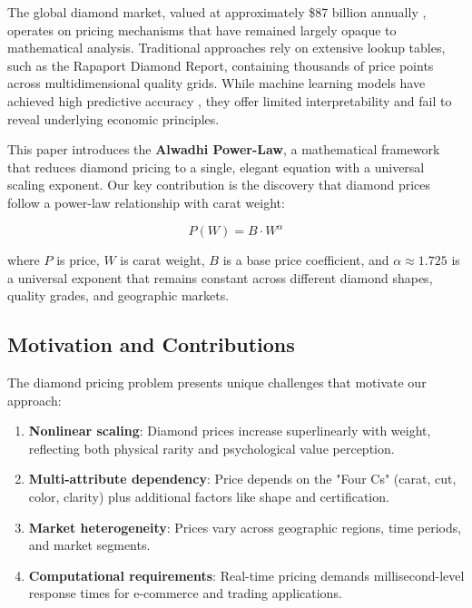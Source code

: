 \documentclass[12pt,a4paper]{article}
\begin{document}
The global diamond market, valued at approximately \$87 billion annually \citep{bain2023}, operates on pricing mechanisms that have remained largely opaque to mathematical analysis. Traditional approaches rely on extensive lookup tables, such as the Rapaport Diamond Report, containing thousands of price points across multidimensional quality grids. While machine learning models have achieved high predictive accuracy \citep{zhang2022}, they offer limited interpretability and fail to reveal underlying economic principles.

This paper introduces the \textbf{Alwadhi Power-Law}, a mathematical framework that reduces diamond pricing to a single, elegant equation with a universal scaling exponent. Our key contribution is the discovery that diamond prices follow a power-law relationship with carat weight:

\begin{equation}
P(W) = B \cdot W^{\alpha}
\label{eq:basic_power_law}
\end{equation}

where $P$ is price, $W$ is carat weight, $B$ is a base price coefficient, and $\alpha \approx 1.725$ is a universal exponent that remains constant across different diamond shapes, quality grades, and geographic markets.

\subsection{Motivation and Contributions}

The diamond pricing problem presents unique challenges that motivate our approach:

\begin{enumerate}
    \item \textbf{Nonlinear scaling}: Diamond prices increase superlinearly with weight, reflecting both physical rarity and psychological value perception.
    
    \item \textbf{Multi-attribute dependency}: Price depends on the "Four Cs" (carat, cut, color, clarity) plus additional factors like shape and certification.
    
    \item \textbf{Market heterogeneity}: Prices vary across geographic regions, time periods, and market segments.
    
    \item \textbf{Computational requirements}: Real-time pricing demands millisecond-level response times for e-commerce and trading applications.
\end{enumerate}
\end{document}

